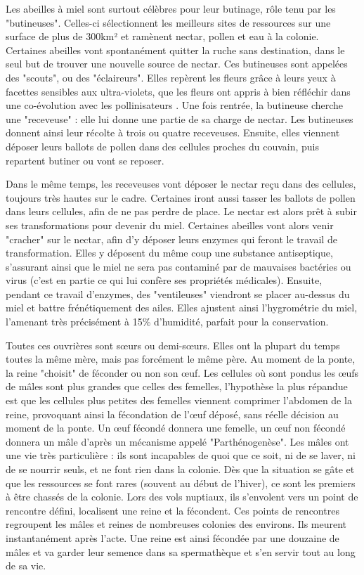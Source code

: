 			
			Les abeilles à miel sont surtout célèbres pour leur butinage, rôle tenu par les "butineuses". Celles-ci sélectionnent les meilleurs sites de ressources sur une surface de plus de 300km² \cite{riviere_modemulti-agent_2021} et ramènent nectar, pollen et eau à la colonie. Certaines abeilles vont spontanément quitter la ruche sans destination, dans le seul but de trouver une nouvelle source de nectar. Ces butineuses sont appelées des "scouts", ou des "éclaireurs". Elles repèrent les fleurs grâce à leurs yeux à facettes sensibles aux ultra-violets, que les fleurs ont appris à bien réfléchir dans une co-évolution avec les pollinisateurs \cite{thompson_concepts_1989}. Une fois rentrée, la butineuse cherche une "receveuse" : elle lui donne une partie de sa charge de nectar. Les butineuses donnent ainsi leur récolte à trois ou quatre receveuses. Ensuite, elles viennent déposer leurs ballots de pollen dans des cellules proches du couvain, puis repartent butiner ou vont se reposer. 
			
			Dans le même temps, les receveuses vont déposer le nectar reçu dans des cellules, toujours très hautes sur le cadre. Certaines iront aussi tasser les ballots de pollen dans leurs cellules, afin de ne pas perdre de place. Le nectar est alors prêt à subir ses transformations pour devenir du miel. Certaines abeilles vont alors venir "cracher" sur le nectar, afin d'y déposer leurs enzymes qui feront le travail de transformation. Elles y déposent du même coup une substance antiseptique, s'assurant ainsi que le miel ne sera pas contaminé par de mauvaises bactéries ou virus (c'est en partie ce qui lui confère ses propriétés médicales). Ensuite, pendant ce travail d'enzymes, des "ventileuses" viendront se placer au-dessus du miel et battre frénétiquement des ailes. Elles ajustent ainsi l'hygrométrie du miel, l'amenant très précisément à 15\% d'humidité, parfait pour la conservation.
			
			Toutes ces ouvrières sont sœurs ou demi-sœurs. Elles ont la plupart du temps toutes la même mère, mais pas forcément le même père. Au moment de la ponte, la reine "choisit" de féconder ou non son œuf. Les cellules où sont pondus les œufs de mâles sont plus grandes que celles des femelles, l'hypothèse la plus répandue est que les cellules plus petites des femelles viennent comprimer l'abdomen de la reine, provoquant ainsi la fécondation de l'œuf déposé, sans réelle décision au moment de la ponte. Un œuf fécondé donnera une femelle, un œuf non fécondé donnera un mâle d'après un mécanisme appelé "Parthénogenèse". 
			Les mâles ont une vie très particulière : ils sont incapables de quoi que ce soit, ni de se laver, ni de se nourrir seuls, et ne font rien dans la colonie. Dès que la situation se gâte et que les ressources se font rares (souvent au début de l'hiver), ce sont les premiers à être chassés de la colonie. Lors des vols nuptiaux, ils s'envolent vers un point de rencontre défini, localisent une reine et la fécondent. Ces points de rencontres regroupent les mâles et reines de nombreuses colonies des environs. Ils meurent instantanément après l'acte. Une reine est ainsi fécondée par une douzaine de mâles et va garder leur semence dans sa spermathèque et s'en servir tout au long de sa vie.
			
